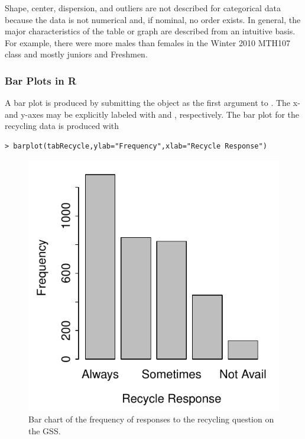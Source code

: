 \documentclass[10pt,openany]{book}\usepackage[]{graphicx}\usepackage[]{color}
\makeatletter
\newenvironment{kframe}{%
 \def\at@end@of@kframe{}%
 \ifinner\ifhmode%
  \def\at@end@of@kframe{\end{minipage}}%
  \begin{minipage}{\columnwidth}%
 \fi\fi%
 \def\FrameCommand##1{\hskip\@totalleftmargin \hskip-\fboxsep
 \colorbox{shadecolor}{##1}\hskip-\fboxsep
     \hskip-\linewidth \hskip-\@totalleftmargin \hskip\columnwidth}%
 \MakeFramed {\advance\hsize-\width
   \@totalleftmargin\z@ \linewidth\hsize
   \@setminipage}}%
 {\par\unskip\endMakeFramed%
 \at@end@of@kframe}
\newenvironment{knitrout}{}{} %
\makeatother
\begin{document}

Shape, center, dispersion, and outliers are not described for categorical data because the data is not numerical and, if nominal, no order exists.  In general, the major characteristics of the table or graph are described from an intuitive basis.  For example, there were more males than females in the Winter 2010 MTH107 class and mostly juniors and Freshmen.


\subsubsection{Bar Plots in R} \label{sect:BarChart}
A bar plot is produced by submitting the  object as the first argument to .  The x- and y-axes may be explicitly labeled with  and , respectively.  The bar plot for the recycling data  is produced with

\begin{knitrout}
\color{fgcolor}\begin{kframe}
\begin{verbatim}
> barplot(tabRecycle,ylab="Frequency",xlab="Recycle Response")
\end{verbatim}
\end{kframe}\begin{figure}[hbtp]

{\centering \includegraphics[width=.4\linewidth]{Figs/Barchart1-1} 

}

\caption[Bar chart of the frequency of responses to the recycling question on the GSS]{Bar chart of the frequency of responses to the recycling question on the GSS.}\label{fig:Barchart1}
\end{figure}


\end{knitrout}
\end{document}
